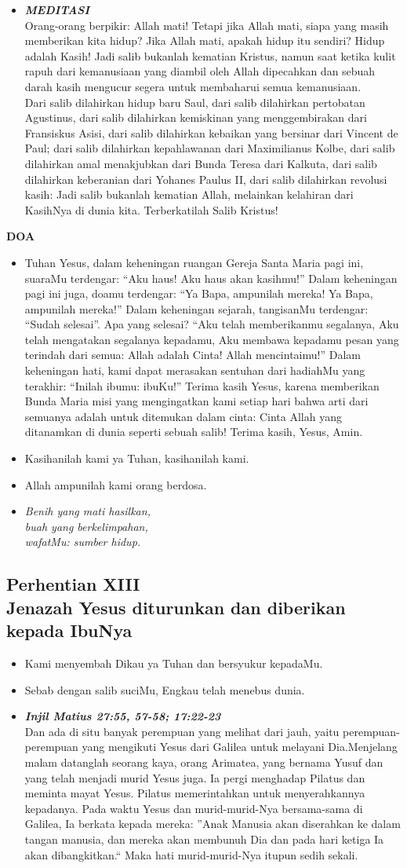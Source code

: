 \documentclass[a5paper,titlepage,11pt,openany]{scrbook}
\newcommand{\BU}[1]{\begin{itemize} \item[U:] #1 \end{itemize}}
\newcommand{\BP}[1]{\begin{itemize} \item[P:] #1 \end{itemize}}
\newcommand{\kamiMenyembah}{\BP{ Kami menyembah Dikau ya Tuhan dan bersyukur kepadaMu.}
\BU{Sebab dengan salib suciMu, Engkau telah menebus dunia.}
}
\newcommand{\kasihanilahKami}{\BP{Kasihanilah kami ya Tuhan, kasihanilah kami.}
\BU{Allah ampunilah kami orang berdosa.}}
\newcommand{\BPi}[2]
{\begin{itemize} \item[P1:] \textbf{\emph{#1}}\\#2 \end{itemize}}
\newcommand{\BPii}[1]
{\begin{itemize} \item[P2:] \textbf{\emph{MEDITASI}}\\#1 \end{itemize}}
\newcommand{\lagu}[2]{%
\begin{itemize}
\item[#1.] \it{#2}
\end{itemize}}
\newcommand{\henti}[2]{%
\subsection*{Perhentian #1\\#2 } 
\kamiMenyembah
}
\begin{document}
\BPii{
	Orang-orang berpikir: Allah mati! Tetapi jika Allah mati, siapa yang masih memberikan kita hidup? Jika Allah mati, apakah hidup itu sendiri? Hidup adalah Kasih! Jadi salib bukanlah kematian Kristus, namun saat ketika kulit rapuh dari kemanusiaan yang diambil oleh Allah dipecahkan dan sebuah darah kasih mengucur segera untuk membaharui semua kemanusiaan. 
\\
	Dari salib dilahirkan hidup baru Saul, dari salib dilahirkan pertobatan Agustinus, dari salib dilahirkan kemiskinan yang menggembirakan dari Fransiskus Asisi, dari salib dilahirkan kebaikan yang bersinar dari Vincent de Paul; dari salib dilahirkan kepahlawanan dari Maximilianus Kolbe, dari salib dilahirkan amal menakjubkan dari Bunda Teresa dari Kalkuta, dari salib dilahirkan keberanian dari Yohanes Paulus II, dari salib dilahirkan revolusi kasih: Jadi salib bukanlah kematian Allah, melainkan kelahiran dari KasihNya di dunia kita. Terberkatilah Salib Kristus! }

\textbf{DOA}

\BU{Tuhan Yesus, dalam keheningan ruangan Gereja Santa Maria pagi ini, suaraMu terdengar: ``Aku haus! Aku haus akan kasihmu!''  Dalam keheningan pagi ini juga, doamu terdengar: ``Ya Bapa, ampunilah mereka! Ya Bapa, ampunilah mereka!''  Dalam keheningan sejarah, tangisanMu terdengar: ``Sudah selesai''. Apa yang selesai? ``Aku telah memberikanmu segalanya, Aku telah mengatakan segalanya kepadamu, Aku membawa kepadamu pesan yang terindah dari semua: Allah adalah Cinta! Allah mencintaimu!'' Dalam keheningan hati, kami dapat merasakan sentuhan dari hadiahMu yang terakhir: ``Inilah ibumu: ibuKu!''  Terima kasih Yesus, karena memberikan Bunda Maria misi yang mengingatkan kami setiap hari bahwa arti dari semuanya adalah untuk ditemukan dalam cinta: Cinta Allah yang ditanamkan di dunia seperti sebuah salib! Terima kasih, Yesus, Amin. }

\kasihanilahKami

\lagu{13}{Benih yang mati hasilkan,\\
buah yang berkelimpahan,\\
wafatMu: sumber hidup.}

\henti{XIII}{	Jenazah Yesus diturunkan dan diberikan kepada IbuNya}

\BPi{	Injil Matius 27:55, 57-58; 17:22-23 }{
	Dan ada di situ banyak perempuan yang melihat dari jauh, yaitu perempuan-perempuan yang mengikuti Yesus dari Galilea untuk melayani Dia.Menjelang malam datanglah seorang kaya, orang Arimatea, yang bernama Yusuf dan yang telah menjadi murid Yesus juga. Ia pergi menghadap Pilatus dan meminta mayat Yesus. Pilatus memerintahkan untuk menyerahkannya kepadanya. Pada waktu Yesus dan murid-murid-Nya bersama-sama di Galilea, Ia berkata kepada mereka: ''Anak Manusia akan diserahkan ke dalam tangan manusia, dan mereka akan membunuh Dia dan pada hari ketiga Ia akan dibangkitkan.`` Maka hati murid-murid-Nya itupun sedih sekali. }
\end{document}
